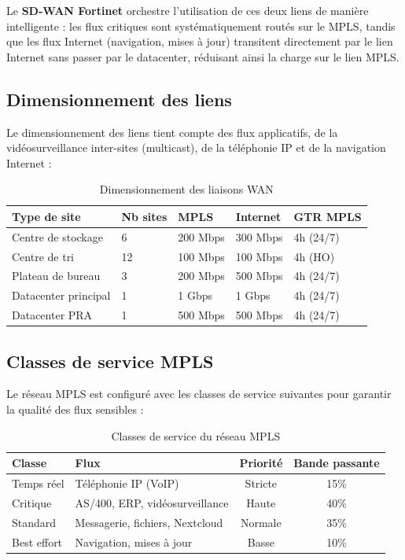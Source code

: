 \documentclass[12pt,a4paper]{report}
\begin{document}
Le \textbf{SD-WAN Fortinet} orchestre l'utilisation de ces deux liens de manière intelligente : les flux critiques sont systématiquement routés sur le MPLS, tandis que les flux Internet (navigation, mises à jour) transitent directement par le lien Internet sans passer par le datacenter, réduisant ainsi la charge sur le lien MPLS.

\subsection{Dimensionnement des liens}

Le dimensionnement des liens tient compte des flux applicatifs, de la vidéosurveillance inter-sites (multicast), de la téléphonie IP et de la navigation Internet :

\begin{table}[H]
\centering
\begin{tabularx}{\textwidth}{L{3.5cm}C{2cm}C{2cm}C{2.5cm}C{2.5cm}}
\toprule
\textbf{Type de site} & \textbf{Nb sites} & \textbf{MPLS} & \textbf{Internet} & \textbf{GTR MPLS} \\
\midrule
Centre de stockage & 6 & 200 Mbps & 300 Mbps & 4h (24/7) \\
Centre de tri & 12 & 100 Mbps & 100 Mbps & 4h (HO) \\
Plateau de bureau & 3 & 200 Mbps & 500 Mbps & 4h (24/7) \\
Datacenter principal & 1 & 1 Gbps & 1 Gbps & 4h (24/7) \\
Datacenter PRA & 1 & 500 Mbps & 500 Mbps & 4h (24/7) \\
\bottomrule
\end{tabularx}
\caption{Dimensionnement des liaisons WAN}
\label{tab:wan_liens}
\end{table}

\subsection{Classes de service MPLS}

Le réseau MPLS est configuré avec les classes de service suivantes pour garantir la qualité des flux sensibles :

\begin{table}[H]
\centering
\begin{tabular}{llcc}
\toprule
\textbf{Classe} & \textbf{Flux} & \textbf{Priorité} & \textbf{Bande passante} \\
\midrule
Temps réel & Téléphonie IP (VoIP) & Stricte & 15\% \\
Critique & AS/400, ERP, vidéosurveillance & Haute & 40\% \\
Standard & Messagerie, fichiers, Nextcloud & Normale & 35\% \\
Best effort & Navigation, mises à jour & Basse & 10\% \\
\bottomrule
\end{tabular}
\caption{Classes de service du réseau MPLS}
\label{tab:cos}
\end{table}
\end{document}
